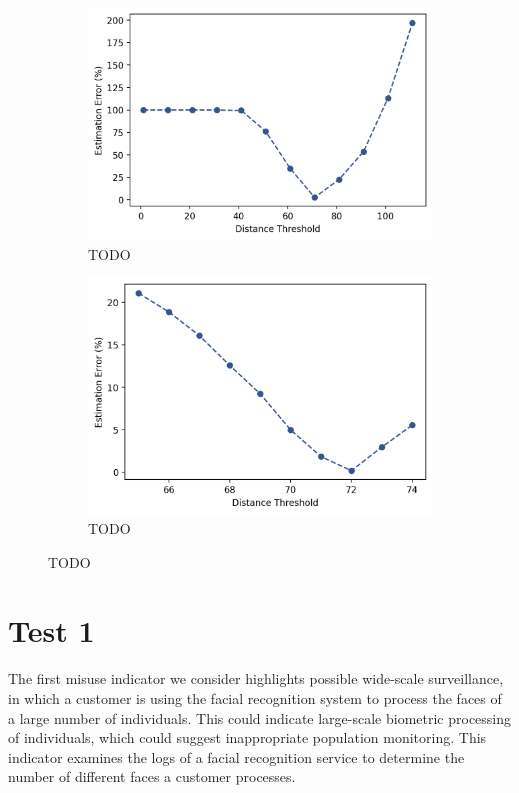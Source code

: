\documentclass[a4paper,12pt]{report}
\begin{document}
	\begin{figure}[ht]
		\begin{subfigure}{.5\textwidth}
			\centering
			\includegraphics[width=.9\linewidth]{images/face/cw-parameter-estimation-1.png}  
			\caption{TODO}
			\label{fig:cw-sub-first}
		\end{subfigure}
		\begin{subfigure}{.5\textwidth}
			\centering
			\includegraphics[width=.9\linewidth]{images/face/cw-parameter-estimation-2.png}  
			\caption{TODO}
			\label{fig:cw-sub-second}
		\end{subfigure}
		\caption{TODO}
		\label{fig:cw12}
	\end{figure}
	
	\section{Test 1}
	The first misuse indicator we consider highlights possible wide-scale surveillance, in which a customer is using the facial recognition system to process the faces of a large number of individuals. This could indicate large-scale biometric processing of individuals, which could suggest inappropriate population monitoring. This indicator examines the logs of a facial recognition service to determine the number of different faces a customer processes.
	
\end{document}
